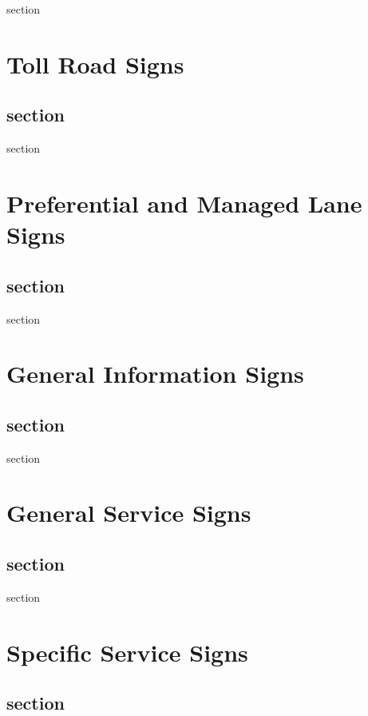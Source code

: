 \documentclass[9pt]{memoir}
\newif\ifshowstatus
\newcommand{\status}[1]{\ifshowstatus\section*{Status}\par#1\par\fi}
\begin{document}
section

\chapter{Toll Road Signs}

\status{Blank.}

\section{section}

section

\chapter{Preferential and Managed Lane Signs}

\status{Blank.}

\section{section}

section

\chapter{General Information Signs}

\status{Blank.}

\section{section}

section

\chapter{General Service Signs}

\status{Blank.}

\section{section}

section

\chapter{Specific Service Signs}

\status{Blank.}

\section{section}
\end{document}
